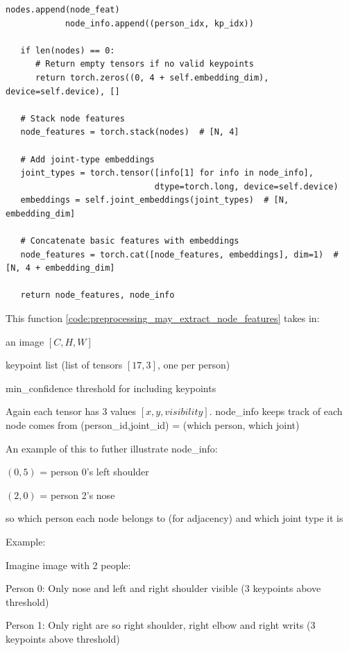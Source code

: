 \begin{lstlisting}[style=pythonstyle,title={Preprocessing May Extract Node Features},label={code:preprocessing_may_extract_node_features}]
            nodes.append(node_feat)
            node_info.append((person_idx, kp_idx))
   
   if len(nodes) == 0:
      # Return empty tensors if no valid keypoints
      return torch.zeros((0, 4 + self.embedding_dim), device=self.device), []
   
   # Stack node features
   node_features = torch.stack(nodes)  # [N, 4]
   
   # Add joint-type embeddings
   joint_types = torch.tensor([info[1] for info in node_info], 
                              dtype=torch.long, device=self.device)
   embeddings = self.joint_embeddings(joint_types)  # [N, embedding_dim]
   
   # Concatenate basic features with embeddings
   node_features = torch.cat([node_features, embeddings], dim=1)  # [N, 4 + embedding_dim]
   
   return node_features, node_info
\end{lstlisting}

This function \ref{code:preprocessing_may_extract_node_features} takes in:
\begin{compactitem}
   \item an image $[C,H,W]$ 
   \item keypoint list (list of tensors $[17,3]$, one per person)
   \item min\_confidence threshold for including keypoints
\end{compactitem}

Again each tensor has 3 values $[x,y,visibility]$. node\_info keeps track of
each node comes from (person\_id,joint\_id) = (which person, which joint)

An example of this to futher illustrate node\_info:
\begin{compactitem}
   \item $(0,5)$ = person 0's left shoulder
   \item $(2,0)$ = person 2's nose
\end{compactitem}

so which person each node belongs to (for adjacency) and which joint type it is

Example:

Imagine image with 2 people:

Person 0: Only nose and left and right shoulder visible (3 keypoints above threshold)

Person 1: Only right are so right shoulder, right elbow and right writs (3 keypoints above threshold)

